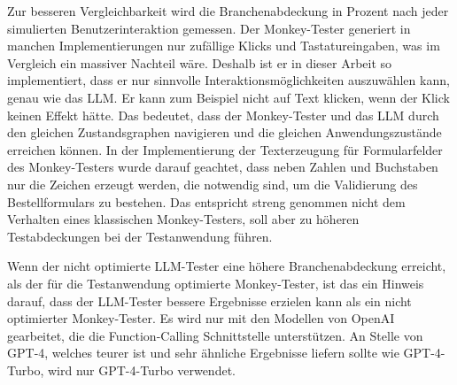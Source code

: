 Zur besseren Vergleichbarkeit wird die Branchenabdeckung in Prozent nach jeder simulierten Benutzerinteraktion gemessen.
Der Monkey-Tester generiert in manchen Implementierungen nur zufällige Klicks und Tastatureingaben, was im Vergleich ein massiver Nachteil wäre.
Deshalb ist er in dieser Arbeit so implementiert, dass er nur \glqq{}sinnvolle\grqq{} Interaktionsmöglichkeiten auszuwählen kann, genau wie das LLM.
Er kann zum Beispiel nicht auf Text klicken, wenn der Klick keinen Effekt hätte.
Das bedeutet, dass der Monkey-Tester und das LLM durch den gleichen Zustandsgraphen navigieren und die gleichen Anwendungszustände erreichen können.
In der Implementierung der Texterzeugung für Formularfelder des Monkey-Testers wurde darauf geachtet, dass neben Zahlen und Buchstaben nur die Zeichen erzeugt werden, die notwendig sind, um die Validierung des Bestellformulars zu bestehen.
Das entspricht streng genommen nicht dem Verhalten eines klassischen Monkey-Testers, soll aber zu höheren Testabdeckungen bei der Testanwendung führen.

Wenn der nicht optimierte LLM-Tester eine höhere Branchenabdeckung erreicht, als der für die Testanwendung optimierte Monkey-Tester, ist das ein Hinweis darauf, dass der LLM-Tester bessere Ergebnisse erzielen kann als ein nicht optimierter Monkey-Tester.
Es wird nur mit den Modellen von OpenAI gearbeitet, die die Function-Calling Schnittstelle unterstützen.
An Stelle von GPT-4, welches teurer ist und sehr ähnliche Ergebnisse liefern sollte wie GPT-4-Turbo, wird nur GPT-4-Turbo verwendet.

